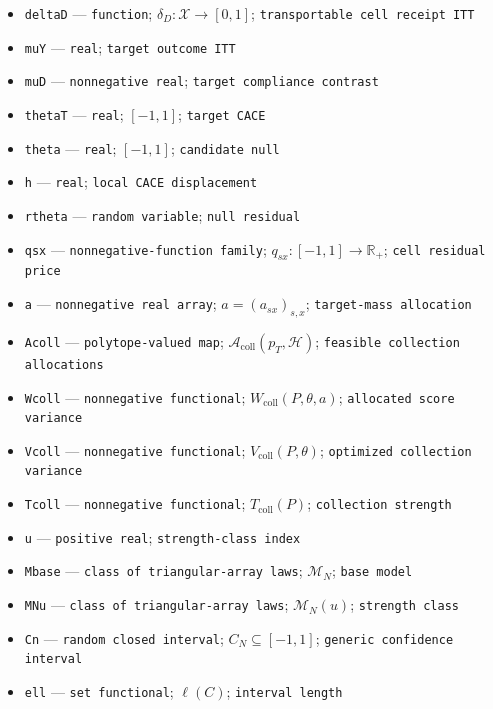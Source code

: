 \documentclass{article}
\begin{document}
\begin{itemize}
  \item \texttt{deltaD} --- \texttt{function}; \(\delta_D:\mathcal X\to[0,1]\); \texttt{transportable cell receipt ITT}
  \item \texttt{muY} --- \texttt{real}; \texttt{target outcome ITT}
  \item \texttt{muD} --- \texttt{nonnegative real}; \texttt{target compliance contrast}
  \item \texttt{thetaT} --- \texttt{real}; \([-1,1]\); \texttt{target CACE}
  \item \texttt{theta} --- \texttt{real}; \([-1,1]\); \texttt{candidate null}
  \item \texttt{h} --- \texttt{real}; \texttt{local CACE displacement}
  \item \texttt{rtheta} --- \texttt{random variable}; \texttt{null residual}
  \item \texttt{qsx} --- \texttt{nonnegative-\allowbreak{}function family}; \(q_{sx}:[-1,1]\to\mathbb R_+\); \texttt{cell residual price}
  \item \texttt{a} --- \texttt{nonnegative real array}; \(a=(a_{sx})_{s,x}\); \texttt{target-\allowbreak{}mass allocation}
  \item \texttt{Acoll} --- \texttt{polytope-\allowbreak{}valued map}; \(\mathcal A_{\mathrm{coll}}(p_T,\mathcal H)\); \texttt{feasible collection allocations}
  \item \texttt{Wcoll} --- \texttt{nonnegative functional}; \(W_{\mathrm{coll}}(P,\theta,a)\); \texttt{allocated score variance}
  \item \texttt{Vcoll} --- \texttt{nonnegative functional}; \(V_{\mathrm{coll}}(P,\theta)\); \texttt{optimized collection variance}
  \item \texttt{Tcoll} --- \texttt{nonnegative functional}; \(T_{\mathrm{coll}}(P)\); \texttt{collection strength}
  \item \texttt{u} --- \texttt{positive real}; \texttt{strength-\allowbreak{}class index}
  \item \texttt{Mbase} --- \texttt{class of triangular-\allowbreak{}array laws}; \(\mathcal M_N\); \texttt{base model}
  \item \texttt{MNu} --- \texttt{class of triangular-\allowbreak{}array laws}; \(\mathcal M_N(u)\); \texttt{strength class}
  \item \texttt{Cn} --- \texttt{random closed interval}; \(C_N\subseteq[-1,1]\); \texttt{generic confidence interval}
  \item \texttt{ell} --- \texttt{set functional}; \(\ell(C)\); \texttt{interval length}

\end{itemize}
\end{document}
